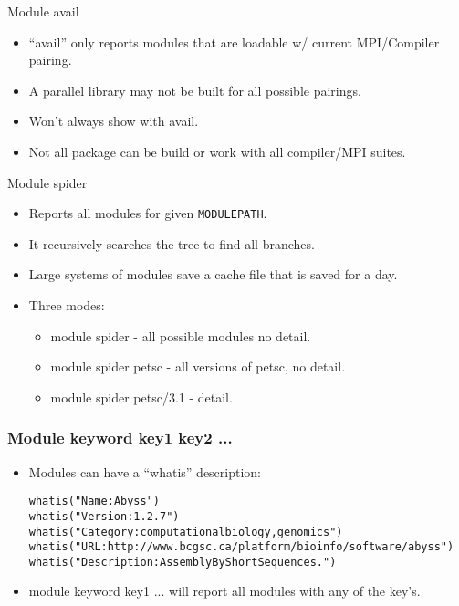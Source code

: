 \documentclass{beamer}
\begin{document}
\begin{frame}{Module avail}
  \begin{itemize}
    \item ``avail'' only reports modules that are loadable w/ current
      MPI/Compiler pairing.
    \item A parallel library may not be built for all possible pairings.
    \item Won't always show with avail.
    \item Not all package can be build or work with all compiler/MPI suites.
  \end{itemize}
\end{frame}

\begin{frame}{Module spider}
  \begin{itemize}
    \item Reports all modules for given \texttt{MODULEPATH}.
    \item It recursively searches the tree to find all branches.
    \item Large systems of modules save a cache file that is saved for
      a day.
    \item Three modes:
      \begin{itemize}
        \item module spider - all possible modules no detail.
        \item module spider petsc - all versions of petsc, no detail.
        \item module spider petsc/3.1 - detail.
      \end{itemize}
  \end{itemize}
\end{frame}

\begin{frame}[fragile]
    \frametitle{Module keyword key1 key2 ...}
    \begin{itemize}
      \item
    Modules can have a ``whatis'' description:
    {\tiny
\begin{alltt}
whatis("Name: Abyss")
whatis("Version: 1.2.7")
whatis("Category: computational biology, genomics")
whatis("URL:http://www.bcgsc.ca/platform/bioinfo/software/abyss")
whatis("Description: Assembly By Short Sequences.")
\end{alltt}
    }
  \item {\color{blue}module keyword key1 ...} will report all modules
    with any of the {\color{blue}key}'s.
  \end{itemize}
\end{frame}
\end{document}
